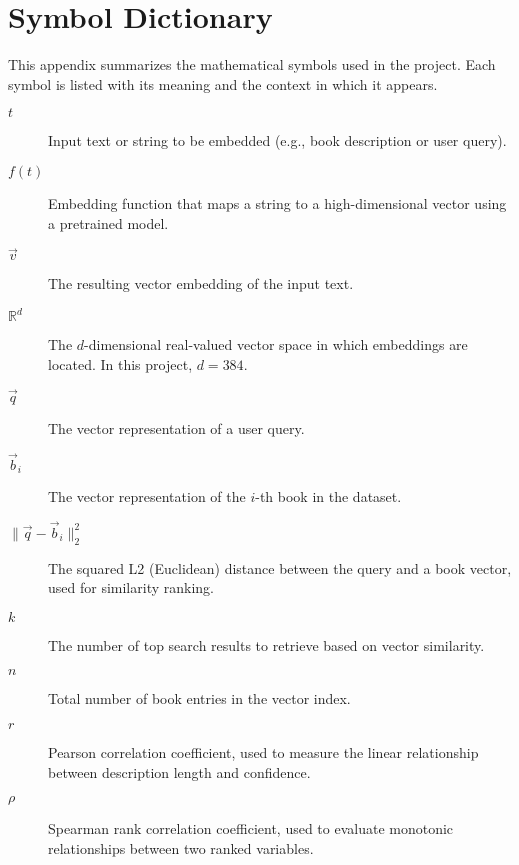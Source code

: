 \chapter{Symbol Dictionary}
\label{appendix:symbols}

This appendix summarizes the mathematical symbols used in the project. Each symbol is listed with its meaning and the context in which it appears.

\begin{description}
    \item[\( t \)] Input text or string to be embedded (e.g., book description or user query).

    \item[\( f(t) \)] Embedding function that maps a string to a high-dimensional vector using a pretrained model.

    \item[\( \vec{v} \)] The resulting vector embedding of the input text.

    \item[\( \mathbb{R}^{d} \)] The \(d\)-dimensional real-valued vector space in which embeddings are located. In this project, \( d = 384 \).

    \item[\( \vec{q} \)] The vector representation of a user query.

    \item[\( \vec{b}_i \)] The vector representation of the \(i\)-th book in the dataset.

    \item[\( \|\vec{q} - \vec{b}_i\|_2^2 \)] The squared L2 (Euclidean) distance between the query and a book vector, used for similarity ranking.

    \item[\( k \)] The number of top search results to retrieve based on vector similarity.

    \item[\( n \)] Total number of book entries in the vector index.

    \item[\( r \)] Pearson correlation coefficient, used to measure the linear relationship between description length and confidence.

    \item[\( \rho \)] Spearman rank correlation coefficient, used to evaluate monotonic relationships between two ranked variables.
\end{description}

